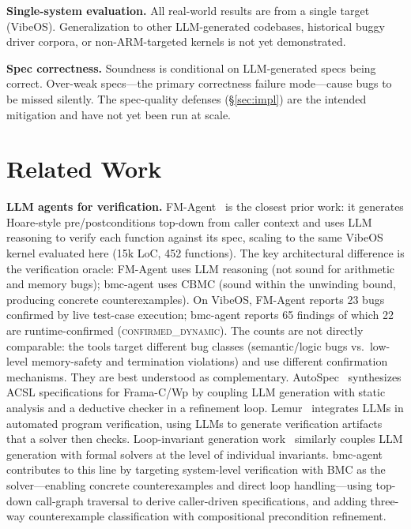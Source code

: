 \documentclass[11pt,a4paper]{article}
\newcommand{\tool}{bmc-agent\xspace}
\newcommand{\fmagent}{FM-Agent\xspace}
\newcommand{\vibeos}{VibeOS\xspace}
\newcommand{\dynconf}{\textsc{confirmed\_dynamic}\xspace}
\begin{document}
\noindent\textbf{Single-system evaluation.}
All real-world results are from a single target (\vibeos). Generalization to
other LLM-generated codebases, historical buggy driver corpora, or
non-ARM-targeted kernels is not yet demonstrated.

\noindent\textbf{Spec correctness.}
Soundness is conditional on LLM-generated specs being correct. Over-weak
specs---the primary correctness failure mode---cause bugs to be missed
silently. The spec-quality defenses (\S\ref{sec:impl}) are the intended
mitigation and have not yet been run at scale.

\section{Related Work}
\label{sec:related}

\noindent\textbf{LLM agents for verification.}
\fmagent~\cite{fmagent} is the closest prior work: it generates Hoare-style
pre/postconditions top-down from caller context and uses LLM reasoning to
verify each function against its spec, scaling to the same \vibeos kernel
evaluated here (15k LoC, 452 functions). The key architectural difference
is the verification oracle: \fmagent uses LLM reasoning (not sound for
arithmetic and memory bugs); \tool uses CBMC (sound within the unwinding
bound, producing concrete counterexamples). On \vibeos, \fmagent reports 23
bugs confirmed by live test-case execution; \tool reports 65 findings of
which 22 are runtime-confirmed (\dynconf). The counts are not directly
comparable: the tools target different bug classes (semantic/logic bugs
vs.\ low-level memory-safety and termination violations) and use different
confirmation mechanisms. They are best understood as complementary.
AutoSpec~\cite{autospec} synthesizes ACSL specifications for Frama-C/Wp by
coupling LLM generation with static analysis and a deductive checker in a
refinement loop. Lemur~\cite{lemur} integrates LLMs in automated program
verification, using LLMs to generate verification artifacts that a solver then
checks. Loop-invariant generation work~\cite{wu-invariants} similarly couples
LLM generation with formal solvers at the level of individual invariants.
\tool contributes to this line by targeting system-level verification with BMC
as the solver---enabling concrete counterexamples and direct loop
handling---using top-down call-graph traversal to derive caller-driven
specifications, and adding three-way counterexample classification with
compositional precondition refinement.
\end{document}
